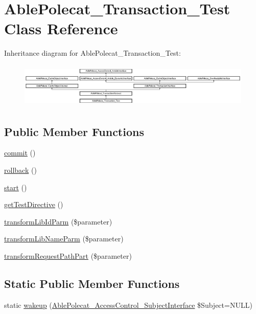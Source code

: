 \hypertarget{class_able_polecat___transaction___test}{}\section{Able\+Polecat\+\_\+\+Transaction\+\_\+\+Test Class Reference}
\label{class_able_polecat___transaction___test}
Inheritance diagram for Able\+Polecat\+\_\+\+Transaction\+\_\+\+Test\+:\begin{figure}[H]
\begin{center}
\leavevmode
\includegraphics[height=2.134146cm]{class_able_polecat___transaction___test}
\end{center}
\end{figure}
\subsection*{Public Member Functions}
\begin{DoxyCompactItemize}
\item 
\hyperlink{class_able_polecat___transaction___test_af5674c27d4a92f6228565010eacbb9cb}{commit} ()
\item 
\hyperlink{class_able_polecat___transaction___test_afa549adf79e3f8c09fe8f903dd5fbfa7}{rollback} ()
\item 
\hyperlink{class_able_polecat___transaction___test_af8fa59992209e36dccb3eefb0f75531f}{start} ()
\item 
\hyperlink{class_able_polecat___transaction___test_ad0cae0f28797f17b524deb0fc6141675}{get\+Test\+Directive} ()
\item 
\hyperlink{class_able_polecat___transaction___test_ae657ec88929b06e2fca3e9d79642c14b}{transform\+Lib\+Id\+Parm} (\$parameter)
\item 
\hyperlink{class_able_polecat___transaction___test_a58e1f95c62a34dfe34829cc52faf8aeb}{transform\+Lib\+Name\+Parm} (\$parameter)
\item 
\hyperlink{class_able_polecat___transaction___test_a1ff6a697dc8f1d08de1891e215241079}{transform\+Request\+Path\+Part} (\$parameter)
\end{DoxyCompactItemize}
\subsection*{Static Public Member Functions}
\begin{DoxyCompactItemize}
\item 
static \hyperlink{class_able_polecat___transaction___test_a3f2135f6ad45f51d075657f6d20db2cd}{wakeup} (\hyperlink{interface_able_polecat___access_control___subject_interface}{Able\+Polecat\+\_\+\+Access\+Control\+\_\+\+Subject\+Interface} \$Subject=N\+U\+L\+L)
\end{DoxyCompactItemize}
